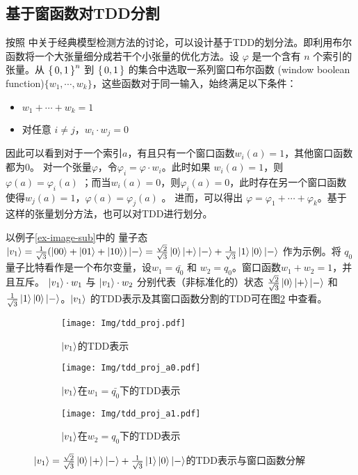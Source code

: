 \subsection*{基于窗函数对TDD分割}
按照 \citep{narayan1996partitioned} 中关于经典模型检测方法的讨论，可以设计基于TDD的划分法。即利用布尔函数将一个大张量细分成若干个小张量的优化方法。设 $\varphi$ 是一个含有 $n$ 个索引的张量。从 $\set{0,1}^n$ 到 $\set{0,1}$ 的集合中选取一系列窗口布尔函数 (window boolean function)$\{w_1,\cdots, w_k\}$，这些函数对于同一输入，始终满足以下条件： 
\begin{itemize}
    \item $w_1+\cdots +w_k=1$
    \item 对任意 $i \neq j$，$w_i \cdot w_j = 0$
\end{itemize} 
因此可以看到对于一个索引$a$，有且只有一个窗口函数$w_i (a) = 1$，其他窗口函数都为$0$。
对一个张量$\varphi$，令$\varphi_i=\varphi \cdot w_i$。此时如果 $w_i(a)=1$，则$\varphi(a)=\varphi_i(a)$ ；而当$w_i(a)=0$，则$\varphi_i(a)=0$，此时存在另一个窗口函数使得$w_j(a)=1$，$\varphi(a)=\varphi_j(a)$ 。
进而，可以得出 $\varphi = \varphi_1+ \cdots +\varphi_k$。基于这样的张量划分方法，也可以对TDD进行划分。

\begin{example}
    以例子\ref{ex-image-sub}中的
    量子态 $\ket{v_1}=\frac{1}{\sqrt{3}}(\ket{00}+\ket{01}+\ket{10})\ket{-}=\frac{\sqrt{2}}{\sqrt{3}}\ket{0}\ket{+}\ket{-}+\frac{1}{\sqrt{3}}\ket{1}\ket{0}\ket{-}$ 作为示例。将 $q_0$ 量子比特看作是一个布尔变量，设$w_1=\bar{q_0}$ 和 $w_2=q_0$。窗口函数$w_1+w_2=1$，并且互斥。 $\ket{v_1}\cdot w_1$ 与 $\ket{v_1} \cdot w_2$ 分别代表（非标准化的）状态 $\frac{\sqrt{2}}{\sqrt{3}}\ket{0}\ket{+}\ket{-}$ 和 $\frac{1}{\sqrt{3}}\ket{1}\ket{0}\ket{-}$。$\ket{v_1}$ 的TDD表示及其窗口函数分割的TDD可在图\ref{fig:tdd-split} 中查看。
    \begin{figure}
    \centering
	\begin{subfigure}[b]{.3\textwidth}
        \centering
        \texttt{[image: Img/tdd\_proj.pdf]}
		\caption{$\ket{v_1}$的TDD表示}
        \label{fig:tdd-split-a}
	\end{subfigure}
	\begin{subfigure}[b]{.3\textwidth}
        \centering
        \texttt{[image: Img/tdd\_proj\_a0.pdf]}
		\caption{$\ket{v_1}$在$w_1=\bar{q_0}$下的TDD表示}
	\end{subfigure}
    \quad
    \begin{subfigure}[b]{.3\textwidth}
        \centering
        \texttt{[image: Img/tdd\_proj\_a1.pdf]}
		\caption{$\ket{v_1}$在$w_2=q_0$下的TDD表示}
	\end{subfigure}
    
    \caption{$\ket{v_1}=\frac{\sqrt{2}}{\sqrt{3}}\ket{0}\ket{+}\ket{-}+\frac{1}{\sqrt{3}}\ket{1}\ket{0}\ket{-}$的TDD表示与窗口函数分解}
    \label{fig:tdd-split}
    \end{figure}
\end{example}
